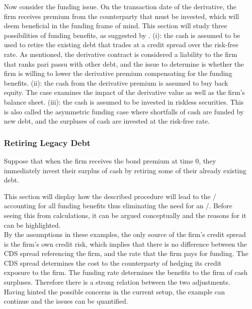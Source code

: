 \documentclass[../main.tex]{subfiles}
\begin{document}
        Now consider the funding issue. On the transaction date of the derivative, 
        the firm receives premium from the counterparty that must be invested, 
        which will deem beneficial in the funding frame of mind. 
        This section will study three possibilities of funding benefits, 
        as suggested by \textcite{Hillion2016}.
        (i): the cash is assumed to be used to retire the existing debt 
        that trades at a credit spread over the risk-free rate. 
        As mentioned, the derivative contract is considered a liability to the firm
        that ranks pari passu with other debt, 
        and the issue to determine is whether the firm is willing to lower the derivative premium 
        compensating for the funding benefits. 
        (ii): the cash from the derivative premium is assumed to buy back equity. 
        The case examines the impact of the derivative value as well as the firm's balance sheet. 
        (iii): the cash is assumed to be invested in riskless securities. 
        This is also called the asymmetric funding case where shortfalls of cash are funded by new debt, 
        and the surpluses of cash are invested at the risk-free rate.

        \subsubsection{Retiring Legacy Debt}
            Suppose that when the firm receives the bond premium at time 0, 
            they immediately invest their surplus of cash by retiring some of their already existing debt.
            
            This section will display how the described procedure will lead to the \DVA/
            accounting for all funding benefits thus eliminating the need for an \FVA/.
            Before seeing this from calculations, it can be argued conceptually
            and the reasons for it can be highlighted.
            \\
            By the assumptions in these examples,
            the only source of the firm's credit spread is the firm's own credit risk, 
            which implies that there is no difference between the CDS spread referencing the firm,
            and the rate that the firm pays for funding.
            The CDS spread determines the cost to the counterparty 
            of hedging its credit exposure to the firm.
            The funding rate determines the benefits to the firm of cash surpluses.
            Therefore there is a strong relation between the two adjustments.
            \\
            Having hinted the possible concerns in the current setup, 
            the example can continue and the issues can be quantified.
\end{document}
